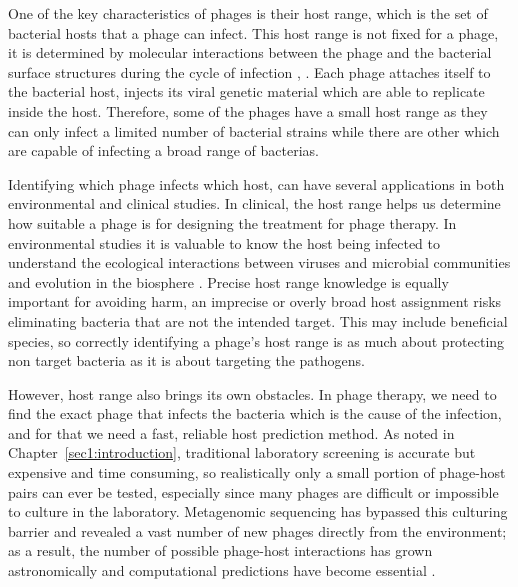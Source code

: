 One of the key characteristics of phages is their host range, which is the set of bacterial hosts that a phage can infect. 
This host range is not fixed for a phage, it is determined by molecular interactions between the phage and the bacterial 
surface structures during the cycle of infection \cite{dejonge2019molecular}, \cite{holtappels2023drivers}. Each phage 
attaches itself to the bacterial host, injects its viral genetic material which are able to replicate inside the host. 
Therefore, some of the phages have a small host range as they can only infect a limited number of 
bacterial strains while there are other which are capable of infecting a broad range of bacterias. 


Identifying which phage infects which host, can have several applications in both environmental 
and clinical studies. In clinical, the host range helps us determine how suitable a phage is for 
designing the treatment for phage therapy. In environmental studies it is valuable to know the 
host being infected to understand the ecological interactions between viruses and microbial 
communities and evolution in the biosphere \cite{holtappels2023drivers}. Precise host range 
knowledge is equally important for avoiding harm, an imprecise or overly broad host assignment 
risks eliminating bacteria that are not the intended target. This may include beneficial species, so 
correctly identifying a phage's host range is as much about protecting non target bacteria as 
it is about targeting the pathogens.

However, host range also brings its own obstacles. In phage therapy, we need to find the exact phage that infects 
the bacteria which is the cause of the infection, and for that we need a fast, reliable host prediction 
method. As noted in Chapter~\ref{sec1:introduction}, traditional laboratory screening is accurate but expensive and time 
consuming, so realistically only a small portion of phage-host pairs can ever be tested, especially since many phages are 
difficult or impossible to culture in the laboratory. Metagenomic sequencing has bypassed this culturing barrier and revealed 
a vast number of new phages directly from the environment; as a result, the number of possible phage-host interactions has 
grown astronomically and computational predictions have become essential \cite{coclet2021global}.



